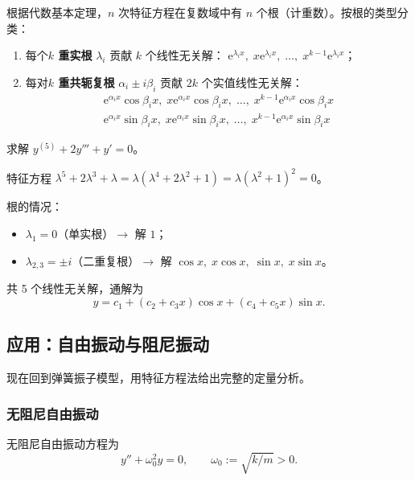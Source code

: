\documentclass[lang=cn,11pt]{elegantbook}
\begin{document}
\begin{property}[$n$ 阶方程的通解结构] \label{property:norder-homog-solution}
根据代数基本定理，$n$ 次特征方程在复数域中有 $n$ 个根（计重数）。按根的类型分类：
\begin{enumerate}
  \item[(i)] 每个\textbf{$k$ 重实根} $\lambda_i$ 贡献 $k$ 个线性无关解：
        $\mathrm{e}^{\lambda_ix},\;x\mathrm{e}^{\lambda_ix},\;\dots,\;x^{k-1}\mathrm{e}^{\lambda_ix}$；
  \item[(ii)] 每对\textbf{$k$ 重共轭复根} $\alpha_i\pm i\beta_i$ 贡献 $2k$ 个实值线性无关解：
        \begin{align*}\mathrm{e}^{\alpha_ix}\cos\beta_ix,\;x\mathrm{e}^{\alpha_ix}\cos\beta_ix,\;\dots,\;x^{k-1}\mathrm{e}^{\alpha_ix}\cos\beta_ix\\\mathrm{e}^{\alpha_ix}\sin\beta_ix,\;x\mathrm{e}^{\alpha_ix}\sin\beta_ix,\;\dots,\;x^{k-1}\mathrm{e}^{\alpha_ix}\sin\beta_ix\end{align*}
\end{enumerate}
\end{property}
\begin{exercise}
求解 $y^{(5)}+2y'''+y'=0$。
\end{exercise}
\begin{solution}
特征方程 $\lambda^5+2\lambda^3+\lambda=\lambda(\lambda^4+2\lambda^2+1)
=\lambda(\lambda^2+1)^2=0$。

根的情况：
\begin{itemize}
  \item $\lambda_1=0$（单实根）$\to$ 解 $1$；
  \item $\lambda_{2,3}=\pm i$（二重复根）$\to$ 解 $\cos x,\;x\cos x,\;\sin x,\;x\sin x$。
\end{itemize}
共 5 个线性无关解，通解为
\[
\boxed{y=c_1+(c_2+c_3x)\cos x+(c_4+c_5x)\sin x}.
\]
\end{solution}


\subsection{应用：自由振动与阻尼振动}

现在回到弹簧振子模型，用特征方程法给出完整的定量分析。


\subsubsection*{无阻尼自由振动}

\begin{exercise}[简谐运动] \label{ex:ode-free-vib}
无阻尼自由振动方程为
\[
y''+\omega_0^2 y=0,\qquad\omega_0:=\sqrt{k/m}>0.
\]
\end{exercise}
\end{document}
